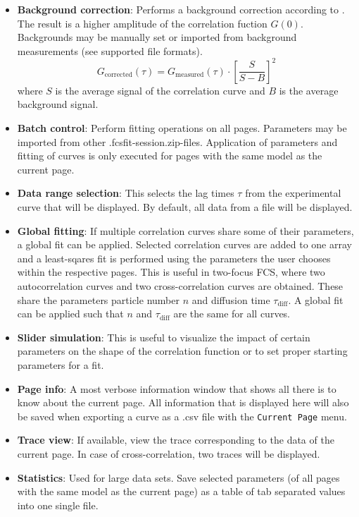 \begin{itemize}
\item \textbf{Background correction}: Performs a background correction according to \cite{Thomps:bookFCS2002}. The result is a higher amplitude of the correlation fuction $G(0)$. Backgrounds may be manually set or imported from background measurements (see supported file formats).
\begin{equation}
G_\mathrm{corrected}(\tau) = G_\mathrm{measured}(\tau) \cdot \left[ \frac{S}{S-B} \right]^2
\label{eq:BG_correction}
\end{equation}
where $S$ is the average signal of the correlation curve and $B$ is the average background signal.
\item \textbf{Batch control}: Perform fitting operations on all pages. Parameters may be imported from other \mytilde .fcsfit-session.zip-files. Application of parameters and fitting of curves is only executed for pages with the same model as the current page.
\item \textbf{Data range selection}: This selects the lag times $\tau$ from the experimental curve that will be displayed. By default, all data from a file will be displayed. 
\item \textbf{Global fitting}: If multiple correlation curves share some of their parameters, a global fit can be applied. Selected correlation curves are added to one array and a least-sqares fit is performed using the parameters the user chooses within the respective pages. This is useful in two-focus FCS, where two autocorrelation curves and two cross-correlation curves are obtained. These share the parameters particle number $n$ and diffusion time $\tau_{\text{diff}}$. A global fit can be applied such that $n$ and $\tau_{\text{diff}}$ are the same for all curves.
\item \textbf{Slider simulation}: This is useful to visualize the impact of certain parameters on the shape of the correlation function or to set proper starting parameters for a fit.
\item \label{Tool:PageInfo}  \textbf{Page info}: A most verbose information window that shows all there is to know about the current page. All information that is displayed here will also be saved when exporting a curve as a \mytilde .csv file with the \texttt{Current Page} menu.
\item \textbf{Trace view}: If available, view the trace corresponding to the data of the current page. In case of cross-correlation, two traces will be displayed.
\item  \textbf{Statistics}: Used for large data sets. Save selected parameters (of all pages with the same model as the current page) as a table of tab separated values into one single file.
\end{itemize}

